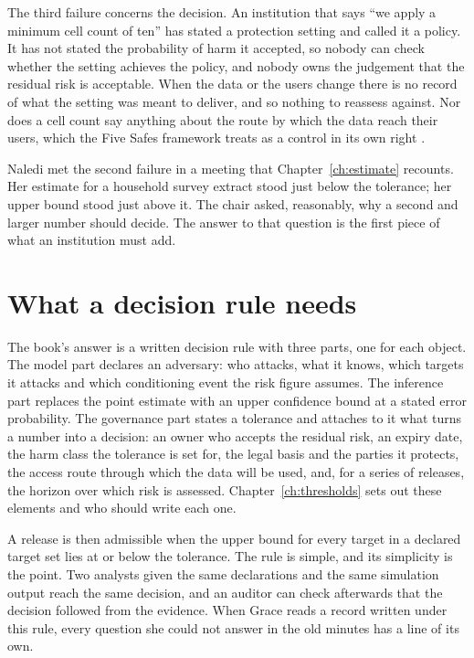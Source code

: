 The third failure concerns the decision. An institution that says ``we apply a minimum
cell count of ten'' has stated a protection setting and called it a policy. It has not
stated the probability of harm it accepted, so nobody can check whether the setting
achieves the policy, and nobody owns the judgement that the residual risk is acceptable.
When the data or the users change there is no record of what the setting was meant to
deliver, and so nothing to reassess against. Nor does a cell count say anything about the route by which the data reach their users, which the Five Safes framework treats as a control in its own right \citep{desai2016}.

Naledi met the second failure in a meeting that Chapter~\ref{ch:estimate} recounts. Her
estimate for a household survey extract stood just below the tolerance; her upper bound
stood just above it. The chair asked, reasonably, why a second and larger number should
decide. The answer to that question is the first piece of what an institution must add.

\section{What a decision rule needs}

The book's answer is a written decision rule with three parts, one for each object. The
model part declares an adversary: who attacks, what it knows, which targets it attacks and
which conditioning event the risk figure assumes. The inference part replaces the point
estimate with an upper confidence bound at a stated error probability. The governance part
states a tolerance and attaches to it what turns a number into a decision: an owner who
accepts the residual risk, an expiry date, the harm class the tolerance is set for, the
legal basis and the parties it protects, the access route through which the data will be
used, and, for a series of releases, the horizon over which risk is assessed.
Chapter~\ref{ch:thresholds} sets out these elements and who should write each one.

A release is then admissible when the upper bound for every target in a declared target set
lies at or below the tolerance. The rule is simple, and its simplicity is the point. Two
analysts given the same declarations and the same simulation output reach the same
decision, and an auditor can check afterwards that the decision followed from the evidence.
When Grace reads a record written under this rule, every question she could not answer in
the old minutes has a line of its own.

